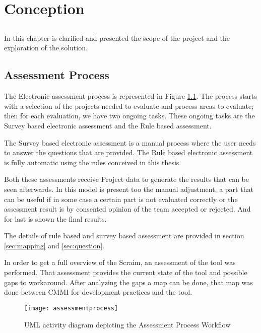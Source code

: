 \chapter{Conception} \label{chap:conception}

\section*{}

In this chapter is clarified and presented the scope of the project and the exploration of the solution.

\section{Assessment Process} \label{sec:Approach}

The Electronic assessment process is represented in Figure \ref{fig:assessmentprocess}.
The process starts with a selection of the projects needed to evaluate and process areas to evaluate; then for each evaluation, we have two ongoing tasks. These ongoing tasks are the Survey based electronic assessment and the Rule based assessment.

The Survey based electronic assessment is a manual process where the user needs to answer the questions that are provided. The Rule based electronic assessment is fully automatic using the rules conceived in this thesis.

Both these assessments receive Project data to generate the results that can be seen afterwards. In this model is present too the manual adjustment, a part that can be useful if in some case a certain part is not evaluated correctly or the assessment result is by consented opinion of the team accepted or rejected. And for last is shown the final results. 

The details of rule based and survey based assessment are provided in section \ref{sec:mapping} and \ref{sec:question}.

In order to get a full overview of the Scraim, an assessment of the tool was performed. That assessment provides the current state of the tool and possible gaps to workaround.
After analyzing the gaps a map can be done, that map was done between CMMI for development practices and the tool.

\newpage
	\begin{figure}[H]
		\begin{center}
			\leavevmode
			\texttt{[image: assessmentprocess]}
			\caption{UML activity diagram depicting the Assessment Process Workflow}
			\label{fig:assessmentprocess}
		\end{center}
	\end{figure}


